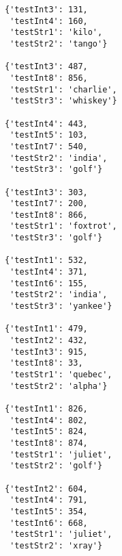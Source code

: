 \begin{verbatim}
{'testInt3': 131,
 'testInt4': 160,
 'testStr1': 'kilo',
 'testStr2': 'tango'}

{'testInt3': 487,
 'testInt8': 856,
 'testStr1': 'charlie',
 'testStr3': 'whiskey'}

{'testInt4': 443,
 'testInt5': 103,
 'testInt7': 540,
 'testStr2': 'india',
 'testStr3': 'golf'}

{'testInt3': 303,
 'testInt7': 200,
 'testInt8': 866,
 'testStr1': 'foxtrot',
 'testStr3': 'golf'}

{'testInt1': 532,
 'testInt4': 371,
 'testInt6': 155,
 'testStr2': 'india',
 'testStr3': 'yankee'}

{'testInt1': 479,
 'testInt2': 432,
 'testInt3': 915,
 'testInt8': 33,
 'testStr1': 'quebec',
 'testStr2': 'alpha'}

{'testInt1': 826,
 'testInt4': 802,
 'testInt5': 824,
 'testInt8': 874,
 'testStr1': 'juliet',
 'testStr2': 'golf'}

{'testInt2': 604,
 'testInt4': 791,
 'testInt5': 354,
 'testInt6': 668,
 'testStr1': 'juliet',
 'testStr2': 'xray'}

\end{verbatim}
